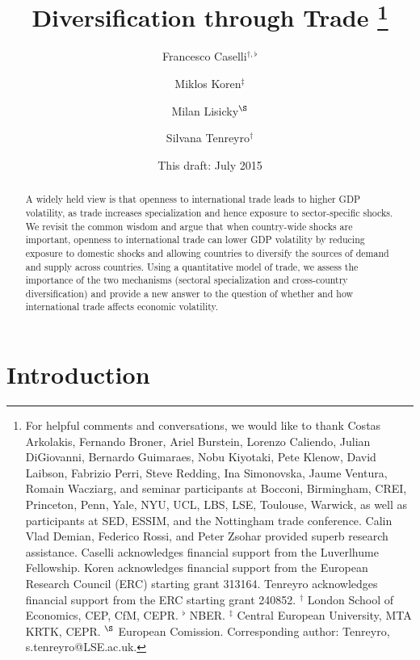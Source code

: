 \documentclass[12pt]{article}
\begin{document}
\title{Diversification through Trade \thanks{%
For helpful comments and conversations, we would like to thank Costas
Arkolakis, Fernando Broner, Ariel Burstein, Lorenzo Caliendo, Julian
DiGiovanni, Bernardo Guimaraes, Nobu Kiyotaki, Pete Klenow, David Laibson,
Fabrizio Perri, Steve Redding, Ina Simonovska, Jaume Ventura, Romain
Wacziarg, and seminar participants at Bocconi, Birmingham, CREI, Princeton,
Penn, Yale, NYU, UCL, LBS, LSE, Toulouse, Warwick, as well as participants
at SED, ESSIM, and the Nottingham trade conference. Calin Vlad Demian,
Federico Rossi, and Peter Zsohar provided superb research assistance.
Caselli acknowledges financial support from the Luverlhume Fellowship. Koren
acknowledges financial support from the European Research Council (ERC)
starting grant 313164. Tenreyro acknowledges financial support from the ERC
starting grant 240852. \newline
$^{\dag }$ London School of Economics, CEP, CfM, CEPR. $^{\flat }$ NBER. $%
^{\ddag }$ Central European University, MTA KRTK, CEPR. $^{\S }$ European
Comission. Corresponding author: Tenreyro, s.tenreyro@LSE.ac.uk.} }
\author{Francesco Caselli$^{\dag ,\flat }$ \and Miklos Koren$^{\ddag }$ \and %
Milan Lisicky$^{\S }$ \and Silvana Tenreyro$^{\dag }$}
\date{This draft: July 2015}
\maketitle

\begin{abstract}
A widely held view is that openness to international trade leads to higher
GDP volatility, as trade increases specialization and hence exposure to
sector-specific shocks. We revisit the common wisdom and argue that when
country-wide shocks are important, openness to international trade can lower
GDP volatility by reducing exposure to domestic shocks and allowing
countries to diversify the sources of demand and supply across countries.
Using a quantitative model of trade, we assess the importance of the two
mechanisms (sectoral specialization and cross-country diversification) and
provide a new answer to the question of whether and how international trade
affects economic volatility.
\end{abstract}

\section{Introduction}
\end{document}
